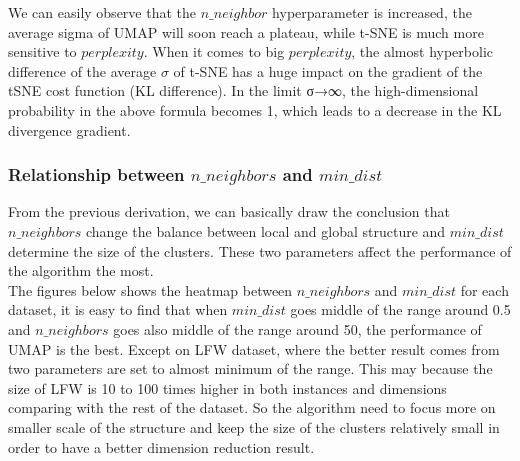 \begin{enumerate}[1)]




We can easily observe that the $n\_neighbor$ hyperparameter is increased, the average sigma of UMAP will soon reach a plateau, while t-SNE is much more sensitive to $perplexity$. When it comes to big $perplexity$, the almost hyperbolic difference of the average $\sigma$ of t-SNE has a huge impact on the gradient of the tSNE cost function (KL difference). In the limit σ→∞, the high-dimensional probability in the above formula becomes 1, which leads to a decrease in the KL divergence gradient.\\

\subsubsection{Relationship between $n\_neighbors$ and $min\_dist$}

From the previous derivation, we can basically draw the conclusion that $n\_neighbors$ change the balance between local and global structure and $min\_dist$ determine the size of the clusters. These two parameters affect the performance of the algorithm the most.\\

The figures below shows the heatmap between $n\_neighbors$ and $min\_dist$ for each dataset, it is easy to find that when $min\_dist$ goes middle of the range around 0.5 and $n\_neighbors$ goes also middle of the range around 50, the performance of UMAP is the best. Except on LFW dataset, where the better result comes from two parameters are set to almost minimum of the range. This may because the size of LFW is 10 to 100 times higher in both instances and dimensions comparing with the rest of the dataset. So the algorithm need to focus more on smaller scale of the structure and keep the size of the clusters relatively small in order to have a better dimension reduction result.  


\end{enumerate}
